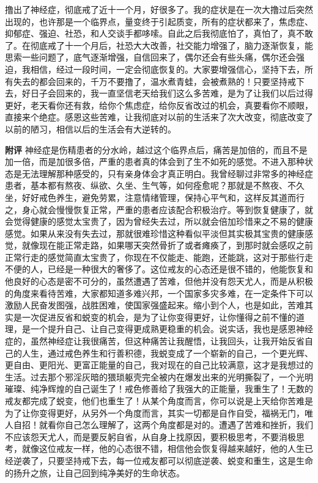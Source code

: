 \begin{case}
    撸出了神经症，彻底戒了近十一个月，好很多了。我的症状是在一次大撸过后突然出现的，也许那是一个临界点，量变终于引起质变，所有的症状都来了，焦虑症、抑郁症、强迫、社恐，和人交谈手都哆嗦。自此之后我彻底怕了，真怕了，真不敢了。在彻底戒了十一个月后，社恐大大改善，社交能力增强了，脑力逐渐恢复，能思索一些问题了，底气逐渐增强，自信回来了，偶尔还会有些头痛，偶尔还会强迫，我相信，经过一段时间，一定会彻底恢复的。大家要增强信心，坚持下去，所有失去的都会回来的，千万不要撸了，温水煮青蛙，会被煮熟的！只要坚持戒下去，好日子会回来的，我一直坚信老天给我们这么多苦难，是为了让我们以后过得更好，老天看你还有救，给你个焦虑症，给你反省改过的机会，真要看你不顺眼，直接来个绝症。感恩这些苦难，让我彻底对以前的生活来了次大改变，彻底改变了以前的陋习，相信以后的生活会有大逆转的。

    \textbf{附评} 神经症是伤精患者的分水岭，越过这个临界点后，痛苦是加倍的，而且不是加一倍，而是加很多倍，严重的患者真的体会到了生不如死的感觉。不进入那种状态是无法理解那种感受的，只有亲身体会才真正明白。我曾经聊过非常多的神经症患者，基本都有熬夜、纵欲、久坐、生气等，如何痊愈呢？那就是不熬夜、不久坐，好好戒色养生，避免劳累，注意情绪管理，保持心平气和，这样反其道而行之，身心就会慢慢恢复正常，严重的患者应该配合积极治疗。等到恢复健康了，就会觉得健康的感觉太宝贵了，因为曾经失去过，所以就会倍加珍惜来之不易的健康感觉。如果从来没有失去过，那就很难珍惜这种看似平淡但其实极其宝贵的健康感觉，就像现在能正常走路，如果哪天突然骨折了或者瘫痪了，到那时就会感叹之前正常行走的感觉简直太宝贵了，你现在不仅能走、能跑，还能跳，这对于那些行走不便的人，已经是一种很大的奢侈了。这位戒友的心态还是很不错的，他能恢复和他良好的心态是密不可分的，虽然遭遇了苦难，但他并没有怨天尤人，而是从积极的角度来看待苦难，大家都知道多难兴邦，一个国家多灾多难，在一定条件下可以激励人民奋发图强，战胜困难，使国家强盛起来。缩小到个人，也是如此，苦难其实是一次促进反省和蜕变的机会，是为了让你变得更好，让你懂得之前不懂的道理，是一个提升自己、让自己变得更成熟更稳重的机会。说实话，我也是感恩神经症的，虽然神经症让我很痛苦，但这种痛苦让我醒悟，让我回头，让我开始反省自己的人生，通过戒色养生和行善积德，我蜕变成了一个崭新的自己，一个更光辉、更自由、更阳光、更富正能量的自己，我对现在的自己比较满意，这才是我想过的生活。过去那个邪淫灰暗的猥琐躯壳完全被内在爆发出来的光明撕裂了，一个光明璀璨、纯净辉煌的自己诞生了！戒色修善给了我强大的正能量，我重生了！无数的戒友都完成了蜕变，他们也重生了！从某个角度而言，你可以说是上天给你苦难是为了让你变得更好，从另外一个角度而言，其实一切都是自作自受，福祸无门，唯人自招！就看你自己怎么理解了，这两个角度都是对的。遭遇了苦难和挫折，我们不应该怨天尤人，而是要反躬自省，从自身上找原因，要积极思考，不要消极思考，就像这位戒友一样，他的心态很不错，相信他会恢复得越来越好，他的人生已经逆袭了，只要坚持戒下去，每一位戒友都可以彻底逆袭、蜕变和重生，这是生命的扬升之旅，让自己回到纯净美好的生命状态。
\end{case}


